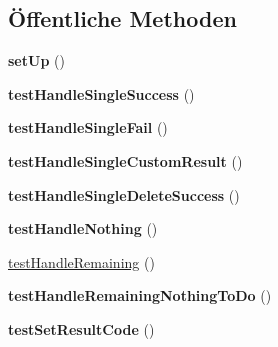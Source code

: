 \subsection*{Öffentliche Methoden}
\begin{DoxyCompactItemize}
\item 
\mbox{\label{class_sabre_1_1_d_a_v_1_1_prop_patch_test_a7620a166530c74ba4dc3542f1c9325bb}} 
{\bfseries set\+Up} ()
\item 
\mbox{\label{class_sabre_1_1_d_a_v_1_1_prop_patch_test_ad6f7ede8581e9fe66ae63ff786ece857}} 
{\bfseries test\+Handle\+Single\+Success} ()
\item 
\mbox{\label{class_sabre_1_1_d_a_v_1_1_prop_patch_test_af78cb0800be26f5c95cb1cff99bd3713}} 
{\bfseries test\+Handle\+Single\+Fail} ()
\item 
\mbox{\label{class_sabre_1_1_d_a_v_1_1_prop_patch_test_a434d8b430e3a1c8d69e8384d5f2df6b5}} 
{\bfseries test\+Handle\+Single\+Custom\+Result} ()
\item 
\mbox{\label{class_sabre_1_1_d_a_v_1_1_prop_patch_test_a18de652f5c3c3a27bfb2f4f07cf271cb}} 
{\bfseries test\+Handle\+Single\+Delete\+Success} ()
\item 
\mbox{\label{class_sabre_1_1_d_a_v_1_1_prop_patch_test_a0ab12178c075a20844d0e7e12637e7fe}} 
{\bfseries test\+Handle\+Nothing} ()
\item 
\mbox{\hyperlink{class_sabre_1_1_d_a_v_1_1_prop_patch_test_a0622c87e103237516dd62ffba79bd3d8}{test\+Handle\+Remaining}} ()
\item 
\mbox{\label{class_sabre_1_1_d_a_v_1_1_prop_patch_test_a9379838b256c03856429384b2c6095ff}} 
{\bfseries test\+Handle\+Remaining\+Nothing\+To\+Do} ()
\item 
\mbox{\label{class_sabre_1_1_d_a_v_1_1_prop_patch_test_a0260ff935d292ad215bbfa8e1f1cd854}} 
{\bfseries test\+Set\+Result\+Code} ()

\end{DoxyCompactItemize}
